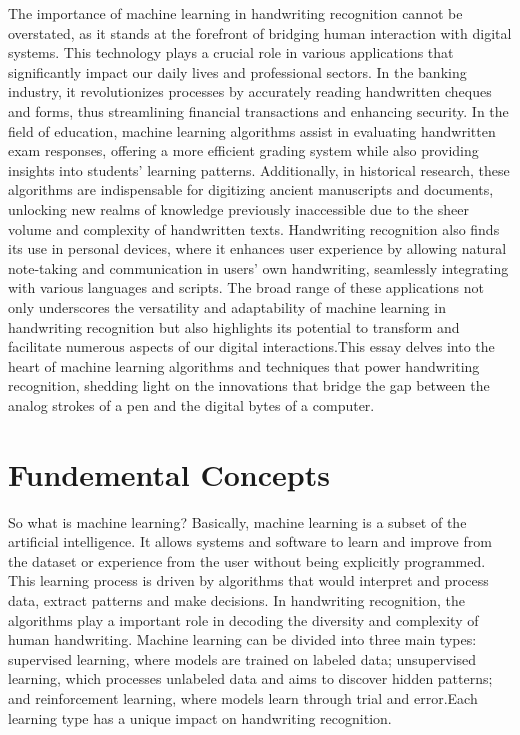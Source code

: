 \documentclass[12pt]{article}
\begin{document}
The importance of machine learning in handwriting recognition cannot be overstated, as it stands at the forefront of bridging human interaction with digital systems. This technology plays a crucial role in various applications that significantly impact our daily lives and professional sectors. In the banking industry, it revolutionizes processes by accurately reading handwritten cheques and forms, thus streamlining financial transactions and enhancing security. In the field of education, machine learning algorithms assist in evaluating handwritten exam responses, offering a more efficient grading system while also providing insights into students' learning patterns. Additionally, in historical research, these algorithms are indispensable for digitizing ancient manuscripts and documents, unlocking new realms of knowledge previously inaccessible due to the sheer volume and complexity of handwritten texts. Handwriting recognition also finds its use in personal devices, where it enhances user experience by allowing natural note-taking and communication in users' own handwriting, seamlessly integrating with various languages and scripts. The broad range of these applications not only underscores the versatility and adaptability of machine learning in handwriting recognition but also highlights its potential to transform and facilitate numerous aspects of our digital interactions.This essay delves into the heart of machine learning algorithms and techniques that power handwriting recognition, shedding light on the innovations that bridge the gap between the analog strokes of a pen and the digital bytes of a computer.

\section* {Fundemental Concepts}
So what is machine learning? Basically, machine learning is a subset of the artificial intelligence. It allows systems and software to learn and improve from the dataset or experience from the user without being explicitly programmed. This learning process is driven by algorithms that would interpret and process data, extract patterns and make decisions. In handwriting recognition, the algorithms play a important role in decoding the diversity and complexity of human handwriting. Machine learning can be divided into three main types: supervised learning, where models are trained on labeled data; unsupervised learning, which processes unlabeled data and aims to discover hidden patterns; and reinforcement learning, where models learn through trial and error.Each learning type has a unique impact on handwriting recognition.
\end{document}
